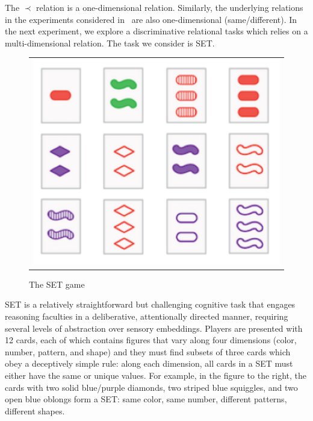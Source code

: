 The $\prec$ relation is a one-dimensional relation. Similarly, the underlying relations in the experiments considered in~\citep{kerg2022neural} are also one-dimensional (same/different). In the next experiment, we explore a discriminative relational tasks which relies on a multi-dimensional relation. The task we consider is SET. 

\begin{figure}
	\vskip-5pt
	\begin{tabular}{c}
		\includegraphics[width=.25\textwidth]{figures/set_example}\\[-5pt]
	\end{tabular}
	\caption{\footnotesize The SET game}
\end{figure}
SET is a relatively straightforward but challenging cognitive task that engages reasoning faculties in a deliberative, attentionally directed manner, requiring several levels of abstraction over sensory embeddings. Players are
presented with 12 cards, each of which contains figures that vary along four dimensions (color, number, pattern, and
shape) and they must find subsets of three cards which obey a deceptively simple rule: along each dimension, all cards in a SET must either have the same or unique values.
For example, in the figure to the right, the cards with two solid blue/purple diamonds, two striped blue squiggles, and two open blue oblongs form a SET: same color, same number, different patterns, different shapes.

